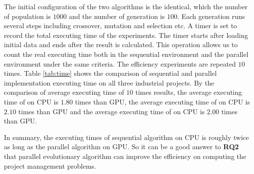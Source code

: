 The initial configuration of the two algorithms is the identical, which the
number of population is $1000$ and the number of generation is $100$. Each
generation runs several steps including crossover, mutation and selection etc. A
timer is set to record the total executing time of the experiments. The timer
starts after loading initial data and ends after the result is calculated. This
operation allows us to count the real executing time both in the sequential
environment and the parallel environment under the same criteria. The efficiency
experiments are repeated $10$ times. Table \ref{tab:time} shows the comparison
of sequential and parallel implementation executing time on all three industrial
projects. By the comparison of average executing time of $10$ times results, the
average executing time of \projectA{} on CPU is $1.80$ times than GPU, the
average executing time of \projectB{} on CPU is $2.10$ times than GPU and the
average executing time of \projectC{} on CPU is $2.00$ times than GPU.

In summary, the executing times of sequential algorithm on CPU is roughly twice
as long as the parallel algorithm on GPU. So it can be a good answer to
\textbf{RQ2} that parallel evolutionary algorithm can improve the efficiency on
computing the project management problems.






